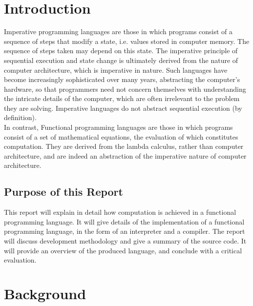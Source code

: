 \documentclass{article}
\begin{document}
\tableofcontents
\pagebreak

\section{Introduction}

Imperative programming languages are those in which programs consist of a sequence of steps that modify a state, i.e. values stored in computer memory. The sequence of steps taken may depend on this state. The imperative principle of sequential execution and state change is ultimately derived from the nature of computer architecture, which is imperative in nature. Such languages have become increasingly sophisticated over many years, abstracting the computer's hardware, so that programmers need not concern themselves with understanding the intricate details of the computer, which are often irrelevant to the problem they are solving. Imperative languages do not abstract sequential execution (by definition).
\\
\indent In contrast, Functional programming languages are those in which programs consist of a set of mathematical equations, the evaluation of which constitutes computation. They are derived from the lambda calculus, rather than computer architecture, and are indeed an abstraction of the imperative nature of computer architecture.

\subsection{Purpose of this Report}
This report will explain in detail how computation is achieved in a functional programming language. It will give details of the implementation of a functional programming language, in the form of an interpreter and a compiler. The report will discuss development methodology and give a summary of the source code. It will provide an overview of the produced language, and conclude with a critical evaluation.

\pagebreak
\section{Background}
\end{document}
